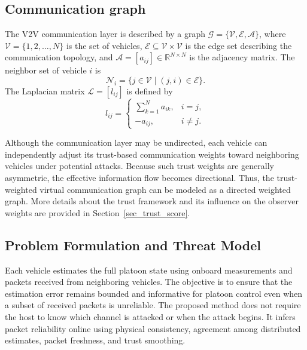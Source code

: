 \documentclass[letterpaper,journal]{IEEEtran}
\def\V{\mathcal{V}} %
\def\E{\mathcal{E}} %
\def\G{\mathcal{G}} %
\def\A{\mathcal{A}} %
\def\L{\mathcal{L}} %
\def\N{\mathcal{N}} %
\begin{document}

\subsection{Communication graph}
The V2V communication layer is described by a graph $\G=\{\V,\E,\A\}$, where $\V=\{1,2,\ldots,N\}$ is the set of vehicles, $\E\subseteq\V\times\V$ is the edge set describing the communication topology, and $\A=[a_{ij}]\in\mathbb{R}^{N\times N}$ is the adjacency matrix. The neighbor set of vehicle $i$ is
\begin{equation}
    \N_i=\{j\in\V\mid (j,i)\in\E\}.
\end{equation}
The Laplacian matrix $\L=[l_{ij}]$ is defined by
\begin{equation}
    l_{ij}=\begin{cases}
        \sum_{k=1}^{N}a_{ik}, & i=j,\\
        -a_{ij}, & i\neq j.
    \end{cases}
\end{equation}

Although the communication layer may be undirected, each vehicle can independently adjust its trust-based communication weights toward neighboring vehicles under potential attacks. Because such trust weights are generally asymmetric, the effective information flow becomes directional. Thus, the trust-weighted virtual communication graph can be modeled as a directed weighted graph. More details about the trust framework and its influence on the observer weights are provided in Section~\ref{sec_trust_score}. 

\subsection{Problem Formulation and Threat Model}\label{subsec_threat_model}

Each vehicle estimates the full platoon state using onboard measurements and packets received from neighboring vehicles. The objective is to ensure that the estimation error remains bounded and informative for platoon control even when a subset of received packets is unreliable.
The proposed method does not require the host to know which channel is attacked or when the attack begins. It infers packet reliability online using physical consistency, agreement among distributed estimates, packet freshness, and trust smoothing.
\end{document}
